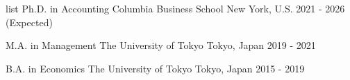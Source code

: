 

\begin{cventries}

    list
    \cventry
    {Ph.D. in Accounting} %
    {Columbia Business School} %
    {New York, U.S.} %
    {2021 - 2026 (Expected)} %
    {}

    \cventry
    {M.A. in Management} %
    {The University of Tokyo} %
    {Tokyo, Japan} %
    {2019 - 2021} %
    {}

    \cventry
    {B.A. in Economics} %
    {The University of Tokyo} %
    {Tokyo, Japan} %
    {2015 - 2019} %
    {}

\end{cventries}
